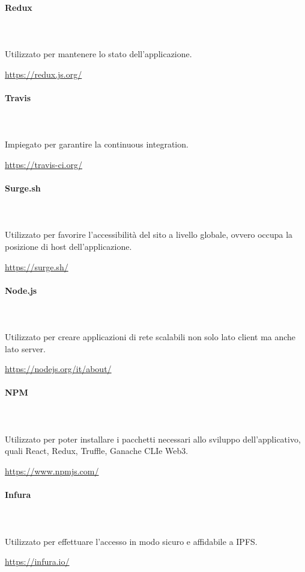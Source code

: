 		\paragraph{Redux} \mbox{}\\ \mbox{}\\
		Utilizzato per mantenere lo stato dell'applicazione.\\
		\centerline{\url{https://redux.js.org/}}
		
		\paragraph{Travis} \mbox{}\\ \mbox{}\\
		Impiegato per garantire la continuous integration.\\
		\centerline{\url{https://travis-ci.org/}}
		
		\paragraph{Surge.sh} \mbox{}\\ \mbox{}\\
		Utilizzato per favorire l'accessibilità del sito a livello globale, ovvero occupa la posizione di host dell'applicazione.\\
		\centerline{\url{https://surge.sh/}}
		
		\paragraph{Node.js} \mbox{}\\ \mbox{}\\
		Utilizzato per creare applicazioni di rete scalabili non solo lato client ma anche lato server.\\
		\centerline{\url{https://nodejs.org/it/about/}}
		
		\paragraph{NPM} \mbox{}\\ \mbox{}\\
		Utilizzato per poter installare i pacchetti necessari allo sviluppo dell'applicativo, quali React\glo, Redux\glo, Truffle\glo, Ganache CLI\glosp e Web3\glo. \\
		\centerline{\url{https://www.npmjs.com/}}
		
		\paragraph{Infura} \mbox{}\\ \mbox{}\\
		Utilizzato per effettuare l'accesso in modo sicuro e affidabile a IPFS\glo. \\
		\centerline{\url{https://infura.io/}}
		
